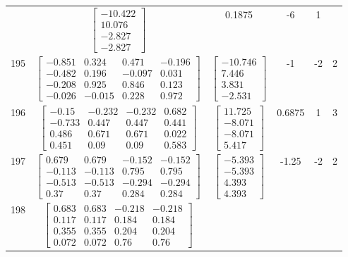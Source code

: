 \documentclass[a4paper,12pt]{article}
\begin{document}
\begin{tabular}{c c c c c c}
&
$\begin{bmatrix} -10.422 \\ 10.076 \\ -2.827 \\ -2.827 \end{bmatrix}$
&
0.1875
&
-6
&
1
\\
195
&
$\begin{bmatrix} -0.851 & 0.324 & 0.471 & -0.196 \\ -0.482 & 0.196 & -0.097 & 0.031 \\ -0.208 & 0.925 & 0.846 & 0.123 \\ -0.026 & -0.015 & 0.228 & 0.972 \end{bmatrix}$
&
$\begin{bmatrix} -10.746 \\ 7.446 \\ 3.831 \\ -2.531 \end{bmatrix}$
&
-1
&
-2
&
2
\\
196
&
$\begin{bmatrix} -0.15 & -0.232 & -0.232 & 0.682 \\ -0.733 & 0.447 & 0.447 & 0.441 \\ 0.486 & 0.671 & 0.671 & 0.022 \\ 0.451 & 0.09 & 0.09 & 0.583 \end{bmatrix}$
&
$\begin{bmatrix} 11.725 \\ -8.071 \\ -8.071 \\ 5.417 \end{bmatrix}$
&
0.6875
&
1
&
3
\\
197
&
$\begin{bmatrix} 0.679 & 0.679 & -0.152 & -0.152 \\ -0.113 & -0.113 & 0.795 & 0.795 \\ -0.513 & -0.513 & -0.294 & -0.294 \\ 0.37 & 0.37 & 0.284 & 0.284 \end{bmatrix}$
&
$\begin{bmatrix} -5.393 \\ -5.393 \\ 4.393 \\ 4.393 \end{bmatrix}$
&
-1.25
&
-2
&
2
\\
198
&
$\begin{bmatrix} 0.683 & 0.683 & -0.218 & -0.218 \\ 0.117 & 0.117 & 0.184 & 0.184 \\ 0.355 & 0.355 & 0.204 & 0.204 \\ 0.072 & 0.072 & 0.76 & 0.76 \end{bmatrix}$

\end{tabular}
\end{document}
